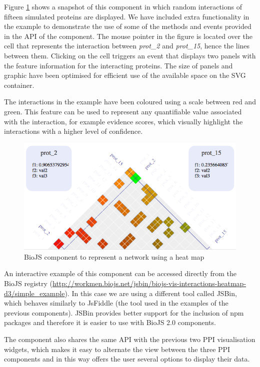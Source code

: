 Figure \ref{fig:biojs_heatmap} shows a snapshot of this component in which random interactions of fifteen simulated proteins are displayed. We have included extra functionality in the example to demonstrate the use of some of the methods and events provided in the API of the component. The mouse pointer in the figure is located over the cell that represents the interaction between \emph{prot\_2} and \emph{prot\_15}, hence the lines between them. Clicking on the cell triggers an event that displays two panels with the feature information for the interacting proteins. The size of panels and graphic have been optimised for efficient use of the available space on the SVG container.

The interactions in the example have been coloured using a scale between red and green. This feature can be used to represent any quantifiable value associated with the interaction, for example evidence scores, which visually highlight the interactions with a higher level of confidence.

\begin{figure}[ht]
\centering
\includegraphics[width=\textwidth]{figures/heatmap.png}
\caption[BioJS component to represent a network using a heat map]{BioJS component to represent a network using a heat map
\label{fig:biojs_heatmap}}
\end{figure}

An interactive example of this component can be accessed directly from the BioJS registry (\url{http://workmen.biojs.net/jsbin/biojs-vis-interactions-heatmap-d3/simple_example}). In this case we are using a different tool called JSBin, which behaves similarly to JsFiddle (the tool used in the examples of the previous components). JSBin provides better support for the inclusion of npm packages and therefore it is easier to use with BioJS 2.0 components.

The component also shares the same API with the previous two PPI visualisation widgets, which makes it easy to alternate the view between the three PPI components and in this way offers the user several options to display their data.


